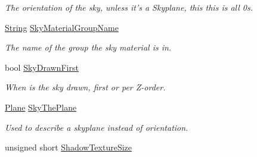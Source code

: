 \begin{DoxyCompactItemize}
\begin{DoxyCompactList}\small\item\em The orientation of the sky, unless it's a Skyplane, this this is all 0s. \item\end{DoxyCompactList}\item 
\hypertarget{classphys_1_1internal_1_1SceneManagerData_a6449ba7dd0d50aa7c121e82982aef54c}{
\hyperlink{namespacephys_aa03900411993de7fbfec4789bc1d392e}{String} \hyperlink{classphys_1_1internal_1_1SceneManagerData_a6449ba7dd0d50aa7c121e82982aef54c}{SkyMaterialGroupName}}
\label{classphys_1_1internal_1_1SceneManagerData_a6449ba7dd0d50aa7c121e82982aef54c}

\begin{DoxyCompactList}\small\item\em The name of the group the sky material is in. \item\end{DoxyCompactList}\item 
\hypertarget{classphys_1_1internal_1_1SceneManagerData_a26e836bd8dd96a85ff9a9dac53a4a16d}{
bool \hyperlink{classphys_1_1internal_1_1SceneManagerData_a26e836bd8dd96a85ff9a9dac53a4a16d}{SkyDrawnFirst}}
\label{classphys_1_1internal_1_1SceneManagerData_a26e836bd8dd96a85ff9a9dac53a4a16d}

\begin{DoxyCompactList}\small\item\em When is the sky drawn, first or per Z-\/order. \item\end{DoxyCompactList}\item 
\hypertarget{classphys_1_1internal_1_1SceneManagerData_aed226bb4935954873f0d4c7bf8308a43}{
\hyperlink{classphys_1_1Plane}{Plane} \hyperlink{classphys_1_1internal_1_1SceneManagerData_aed226bb4935954873f0d4c7bf8308a43}{SkyThePlane}}
\label{classphys_1_1internal_1_1SceneManagerData_aed226bb4935954873f0d4c7bf8308a43}

\begin{DoxyCompactList}\small\item\em Used to describe a skyplane instead of orientation. \item\end{DoxyCompactList}\item 
\hypertarget{classphys_1_1internal_1_1SceneManagerData_a6564afc7255e32e9211568aab4a561f2}{
unsigned short \hyperlink{classphys_1_1internal_1_1SceneManagerData_a6564afc7255e32e9211568aab4a561f2}{ShadowTextureSize}}
\label{classphys_1_1internal_1_1SceneManagerData_a6564afc7255e32e9211568aab4a561f2}


\end{DoxyCompactItemize}
